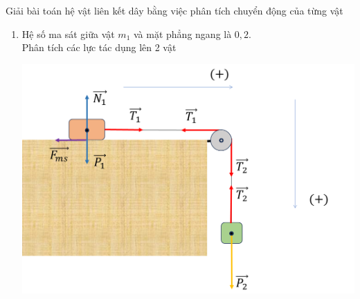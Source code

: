 \begin{dang}{Giải bài toán hệ vật liên kết dây bằng việc phân tích chuyển động của từng vật}
{{\begin{enumerate}[label=\alph*)]
\begin{itemize}
	\item Vật 2:
	\begin{equation}
		\label{eq:2}
		\overrightarrow{P_2}+\overrightarrow{T_2}=m_2\overrightarrow{a_2}
	\end{equation}
\end{itemize}
Chọn chiều dương như hình vẽ.\\
Lần lượt chiếu phương trình (\ref{eq:1}) và (\ref{eq:2}) lên chiều dương, ta thu được:
\begin{equation}
	\label{eq:3}
	T_1=m_1a_1
\end{equation}
và
\begin{equation}
	\label{eq:4}
	P_2-T_2=m_2a_2
\end{equation}
Vì dây không dãn và bỏ qua khối lượng của ròng rọc nên
$$\begin{cases}
	T_1=T_2=T\\
	a_1=a_2=a
\end{cases}$$
Thay vào phương trình (\ref{eq:3}) và (\ref{eq:4}):
\begin{align}
	\label{eq:5}
	\begin{cases}
		T=m_1a\\
		P_2-T=m_2a
	\end{cases}
\end{align}
$$\Rightarrow P_2=\left(m_1+m_2\right)\cdot a$$
\begin{equation}
	\label{eq:6}
	\Rightarrow a=\dfrac{m_2g}{m_1+m_2}=\dfrac{\left(\SI{4}{\kilogram}\right)\cdot\left(\SI{10}{\meter/\second^2}\right)}{\left(\SI{6}{\kilogram}\right)+\left(\SI{4}{\kilogram}\right)}=\SI{4}{\meter/\second^2}
\end{equation}
Thay phương trình (\ref{eq:6}) vào phương trình (\ref{eq:3}), ta xác định được lực căng dây:
$$T=m_1a=\left(\SI{6}{\kilogram}\right)\cdot\left(\SI{4}{\meter/\second^2}\right)=\SI{24}{\newton}$$
Quãng đường mỗi vật đi được sau 1 giây:
$$s=\dfrac{1}{2}at^2=\dfrac{1}{2}\cdot\left(\SI{4}{\meter/\second^2}\right)\cdot\left(\SI{1}{\second}\right)^2=\SI{2}{\meter}$$
Lực nén lên trục ròng rọc:
$$\overrightarrow{Q}=\overrightarrow{T_1}+\overrightarrow{T_2}$$
$$\Rightarrow Q=\sqrt{T^2_1+T^2_2}=T\sqrt{2}=\xsi{24\sqrt{2}}{\newton}.$$
\item Hệ số ma sát giữa vật $m_1$ và mặt phẳng ngang là $0,2$.\\
Phân tích các lực tác dụng lên 2 vật
\begin{center}
	\includegraphics[width=0.6\linewidth]{../figs/VN10-2023-PH-TP021-3}

\end{center}
\end{enumerate}}}
\end{dang}
